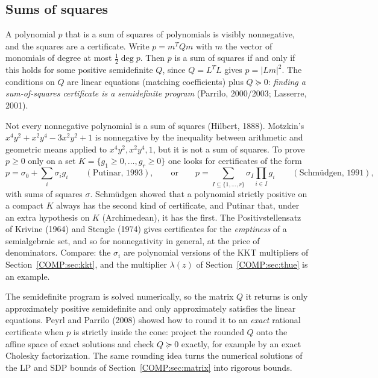 \documentclass[11pt,openany]{book}
\theoremstyle{plain}
\theoremstyle{definition}
\theoremstyle{remark}
\newcommand{\abs}[1]{\left\lvert #1 \right\rvert}
\begin{document}
\subsection{Sums of squares}
A polynomial $p$ that is a sum of squares of polynomials is visibly nonnegative, and the squares are a
certificate. Write $p=m^TQm$ with $m$ the vector of monomials of degree at most $\frac12\deg p$. Then $p$ is
a sum of squares if and only if this holds for some positive semidefinite $Q$, since $Q=L^TL$ gives
$p=\abs{Lm}^2$. The conditions on $Q$ are linear equations (matching coefficients) plus $Q\succeq0$:
\emph{finding a sum-of-squares certificate is a semidefinite program} (Parrilo, 2000/2003; Lasserre, 2001).

Not every nonnegative polynomial is a sum of squares (Hilbert, 1888). Motzkin's
$x^4y^2+x^2y^4-3x^2y^2+1$ is nonnegative by the inequality between arithmetic and geometric means applied
to $x^4y^2,x^2y^4,1$, but it is not a sum of squares. To prove $p\ge0$ only on a set
$K=\{g_1\ge0,\dots,g_r\ge0\}$ one looks for certificates of the form
\[
  p=\sigma_0+\sum_i\sigma_ig_i\qquad(\text{Putinar, 1993}),\qquad\text{or}\qquad
  p=\sum_{I\subseteq\{1,\dots,r\}}\sigma_I\prod_{i\in I}g_i\qquad(\text{Schm\"udgen, 1991}),
\]
with sums of squares $\sigma$. Schm\"udgen showed that a polynomial strictly positive on a compact $K$ always
has the second kind of certificate, and Putinar that, under an extra hypothesis on $K$ (Archimedean), it has the
first. The Positivstellensatz of Krivine (1964) and Stengle (1974) gives certificates for the
\emph{emptiness} of a semialgebraic set, and so for nonnegativity in general, at the price of denominators.
Compare: the $\sigma_i$ are polynomial versions of the KKT multipliers of Section~\ref{COMP:sec:kkt}, and the
multiplier $\lambda(z)$ of Section~\ref{COMP:sec:thue} is an example.

The semidefinite program is solved numerically, so the matrix $Q$ it returns is only approximately positive
semidefinite and only approximately satisfies the linear equations. Peyrl and Parrilo (2008) showed how to
round it to an \emph{exact} rational certificate when $p$ is strictly inside the cone: project the rounded $Q$
onto the affine space of exact solutions and check $Q\succeq0$ exactly, for example by an exact Cholesky
factorization. The same rounding idea turns the numerical solutions of the LP and SDP bounds of
Section~\ref{COMP:sec:matrix} into rigorous bounds.
\end{document}
